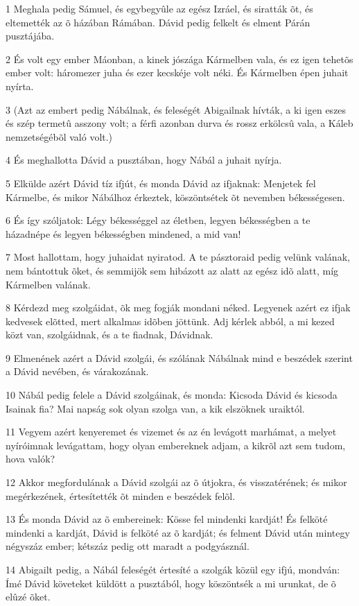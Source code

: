 \par 1 Meghala pedig Sámuel, és egybegyûle az egész Izráel, és siratták õt, és eltemették az õ házában Rámában. Dávid pedig felkelt és elment Párán pusztájába.
\par 2 És volt egy ember Máonban, a kinek jószága Kármelben vala, és ez igen tehetõs ember volt: háromezer juha és ezer kecskéje volt néki. És Kármelben épen juhait nyírta.
\par 3 (Azt az embert pedig Nábálnak, és feleségét Abigailnak hívták, a ki igen eszes és szép termetû asszony volt; a férfi azonban durva és rossz erkölcsû vala, a Káleb nemzetségébõl való volt.)
\par 4 És meghallotta Dávid a pusztában, hogy Nábál a juhait nyírja.
\par 5 Elkülde azért Dávid tíz ifjút, és monda Dávid az ifjaknak: Menjetek fel Kármelbe, és mikor Nábálhoz érkeztek, köszöntsétek õt nevemben békességesen.
\par 6 És így szóljatok: Légy békességgel az életben, legyen békességben a te házadnépe és legyen békességben mindened, a mid van!
\par 7 Most hallottam, hogy juhaidat nyiratod. A te pásztoraid pedig velünk valának, nem bántottuk õket, és semmijök sem hibázott az alatt az egész idõ alatt, míg Kármelben valának.
\par 8 Kérdezd meg szolgáidat, õk meg fogják mondani néked. Legyenek azért ez ifjak kedvesek elõtted, mert alkalmas idõben jöttünk. Adj kérlek abból, a mi kezed közt van, szolgáidnak, és a te fiadnak, Dávidnak.
\par 9 Elmenének azért a Dávid szolgái, és szólának Nábálnak mind e beszédek szerint a Dávid nevében, és várakozának.
\par 10 Nábál pedig felele a Dávid szolgáinak, és monda: Kicsoda Dávid és kicsoda Isainak fia? Mai napság sok olyan szolga van, a kik elszöknek uraiktól.
\par 11 Vegyem azért kenyeremet és vizemet és az én levágott marhámat, a melyet nyíróimnak levágattam, hogy olyan embereknek adjam, a kikrõl azt sem tudom, hova valók?
\par 12 Akkor megfordulának a Dávid szolgái az õ útjokra, és visszatérének; és mikor megérkezének, értesítették õt minden e beszédek felõl.
\par 13 És monda Dávid az õ embereinek: Kösse fel mindenki kardját! És felköté mindenki a kardját, Dávid is felköté az õ kardját; és felment Dávid után mintegy négyszáz ember; kétszáz pedig ott maradt a podgyásznál.
\par 14 Abigailt pedig, a Nábál feleségét értesíté a szolgák közül egy ifjú, mondván: Ímé Dávid követeket küldött a pusztából, hogy köszöntsék a mi urunkat, de õ elûzé õket.
